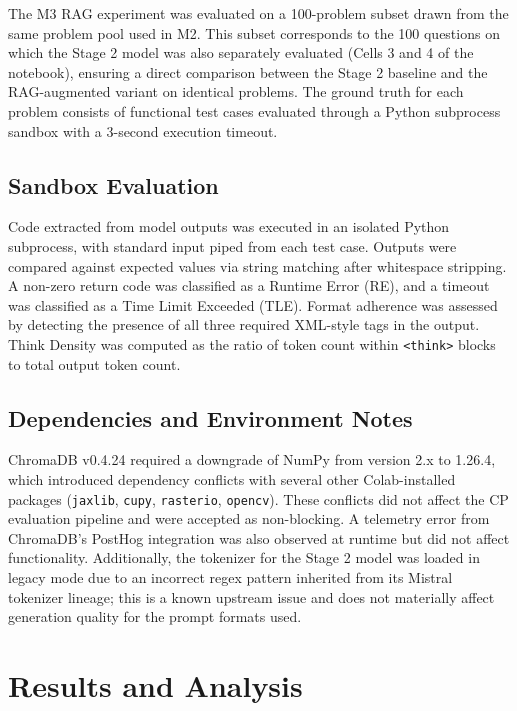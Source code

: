 \documentclass[12pt,a4paper]{article}
\begin{document}
The M3 RAG experiment was evaluated on a 100-problem subset drawn from the same problem pool used in M2. This subset corresponds to the 100 questions on which the Stage 2 model was also separately evaluated (Cells 3 and 4 of the notebook), ensuring a direct comparison between the Stage 2 baseline and the RAG-augmented variant on identical problems. The ground truth for each problem consists of functional test cases evaluated through a Python subprocess sandbox with a 3-second execution timeout.

\subsection{Sandbox Evaluation}

Code extracted from model outputs was executed in an isolated Python subprocess, with standard input piped from each test case. Outputs were compared against expected values via string matching after whitespace stripping. A non-zero return code was classified as a Runtime Error (RE), and a timeout was classified as a Time Limit Exceeded (TLE). Format adherence was assessed by detecting the presence of all three required XML-style tags in the output. Think Density was computed as the ratio of token count within \texttt{<think>} blocks to total output token count.

\subsection{Dependencies and Environment Notes}

ChromaDB v0.4.24 required a downgrade of NumPy from version 2.x to 1.26.4, which introduced dependency conflicts with several other Colab-installed packages (\texttt{jaxlib}, \texttt{cupy}, \texttt{rasterio}, \texttt{opencv}). These conflicts did not affect the CP evaluation pipeline and were accepted as non-blocking. A telemetry error from ChromaDB's PostHog integration was also observed at runtime but did not affect functionality. Additionally, the tokenizer for the Stage 2 model was loaded in legacy mode due to an incorrect regex pattern inherited from its Mistral tokenizer lineage; this is a known upstream issue and does not materially affect generation quality for the prompt formats used.

\section{Results and Analysis}
\label{sec:results}
\end{document}
